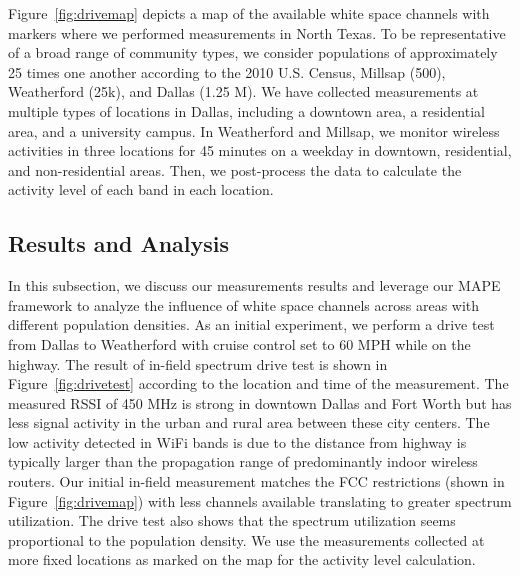 Figure~\ref{fig:drivemap} depicts a map of the available white space channels with
markers where we performed measurements in North Texas. To be representative of a broad range of
community types, we consider populations of approximately 25 times one another according to the
2010 U.S. Census, Millsap (500), Weatherford (25k), and Dallas (1.25 M).
We have collected measurements at multiple types of locations in Dallas, including a downtown area,
a residential area, and a university campus. In Weatherford and Millsap, we monitor wireless activities 
in three locations for 45 minutes on a weekday in downtown, residential, and non-residential areas.
Then, we post-process the data to calculate the activity level of each band in each location.

\subsection{Results and Analysis} 
\label{subsec:result}
In this subsection, we discuss our measurements results and leverage our MAPE framework 
to analyze the influence of white space channels across areas with different population densities.
As an initial experiment, we perform a drive test from Dallas to Weatherford with cruise control 
set to 60 MPH while on the highway. The result of in-field spectrum drive test is shown in 
Figure~\ref{fig:drivetest} according to the location and time of the measurement.
The measured RSSI of 450 MHz is strong in downtown Dallas and Fort Worth 
but has less signal activity in the urban and rural area between these city centers.
The low activity detected in WiFi bands is due to the distance from highway is typically
larger than the propagation range of predominantly indoor wireless routers.
Our initial in-field measurement matches the FCC restrictions (shown in Figure~\ref{fig:drivemap}) with
less channels available translating to greater spectrum utilization.
The drive test also shows that the spectrum utilization seems proportional to the population
density. We use the measurements collected at more fixed locations as marked on the map for
the activity level calculation. 

